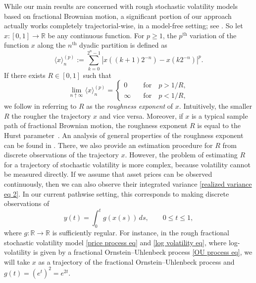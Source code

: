\documentclass[12pt,reqno]{article}
\def\ua{\uparrow}
\numberwithin{equation}{section}
\theoremstyle{definition}
\def\<{\langle}
\def\>{\rangle}
\def\ua{\uparrow}
\newcommand{\bR}{\mathbb{R}}
\begin{document}
 While our main results are concerned with rough stochastic volatility models based on fractional Brownian motion, a significant portion of our approach actually works completely trajectorial-wise, in a model-free setting; see . So let $x:[0,1]\to\bR$  be any continuous function.
 For  $p \ge1$, the $p^\text{th}$ variation of the function $x$ along the $n^{\text{th}}$ dyadic partition  is defined as
 \begin{equation}\label{eq p variation}
\<x\>^{(p)}_n:= \sum_{k = 0}^{2^n-1}|x((k+1)2^{-n}) - x(k2^{-n})|^p.
\end{equation}
If there exists ${R} \in [0,1]$ such that 
\begin{equation*}
\lim_{n \ua \infty} \<x\>^{(p)}_n = \begin{cases}
0 &\quad \text{for} \quad p > 1/{R},\\
\infty &\quad \text{for} \quad p < 1/{R},
\end{cases}
\end{equation*}
we follow \cite{HanSchiedHurst} in referring to ${R}$ as the \textit{roughness exponent} of $x$. Intuitively, the smaller $R$ the rougher the trajectory $x$ and vice versa. Moreover, if $x$ is a typical sample path of  fractional Brownian motion, the roughness exponent ${R}$ is equal to the  Hurst parameter~\cite[Theorem 5.1]{HanSchiedHurst}. An analysis of  general properties of the roughness exponent can be found in  \cite{HanSchiedHurst}. There, we also provide an estimation procedure for ${R}$ from discrete observations of the trajectory $x$. 
However, the problem of estimating ${R}$ for a trajectory of stochastic volatility is more complex, because volatility cannot be measured directly. If we assume that asset prices can be observed continuously, then we can also observe their integrated variance \eqref{realized variance eq 2}. In our current pathwise setting, this corresponds to making  discrete observations of 
\begin{equation}\label{y antiderivative eq}
y(t)=\int_0^t g(x(s))\,ds,\qquad 0\le t\le 1,
\end{equation}
where $g:\bR\to\bR$ is sufficiently regular. For instance, in the rough fractional stochastic volatility model \eqref{price process eq}  and  \eqref{log volatility eq}, where log-volatility is given by a fractional Ornstein--Uhlenbeck process  \eqref{OU process eq}, we will take $x$ as a trajectory of the fractional Ornstein--Uhlenbeck process and $g(t)=(e^{t})^2=e^{2t}$. 
\end{document}

